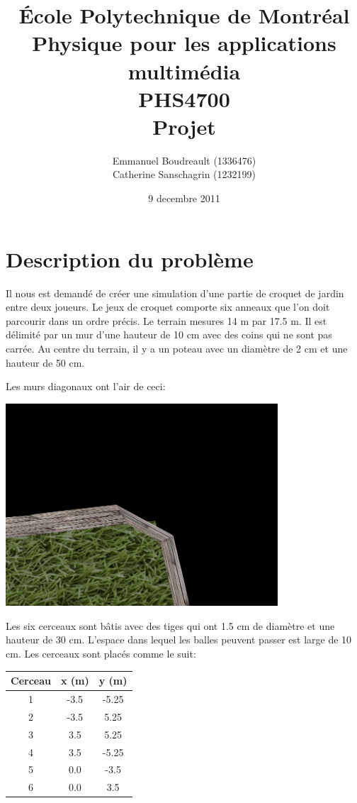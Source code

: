 \documentclass{article}
\begin{document}
\title{
  École Polytechnique de Montréal \\
  Physique pour les applications multimédia \\
  PHS4700 \\
  Projet
}

\author{
  Emmanuel Boudreault (1336476) \\
  Catherine Sanschagrin (1232199)
}

\date{9 decembre 2011}

\maketitle

\newpage

\section*{Description du problème}

Il nous est demandé de créer une simulation d'une partie de croquet de
jardin entre deux joueurs. Le jeux de croquet comporte six anneaux que
l'on doit parcourir dans un ordre précis. Le terrain mesures 14 m par
17.5 m. Il est délimité par un mur d'une hauteur de 10 cm avec des
coins qui ne sont pas carrée. Au centre du terrain, il y a un poteau
avec un diamètre de 2 cm et une hauteur de 50 cm.

Les murs diagonaux ont l'air de ceci:

\includegraphics[width=4in]{wall.png}

Les six cerceaux sont bâtis avec des tiges qui ont 1.5 cm de diamètre
et une hauteur de 30 cm. L'espace dans lequel les balles peuvent
passer est large de 10 cm. Les cerceaux sont placés comme le suit:

\begin{tabular}{| c | c | c |}
\hline
Cerceau & x (m) & y (m) \\
\hline
1 & -3.5 & -5.25 \\
2 & -3.5 & 5.25 \\
3 & 3.5 & 5.25 \\
4 & 3.5 & -5.25 \\
5 & 0.0 & -3.5 \\
6 & 0.0 & 3.5 \\
\hline
\end{tabular}
\end{document}
